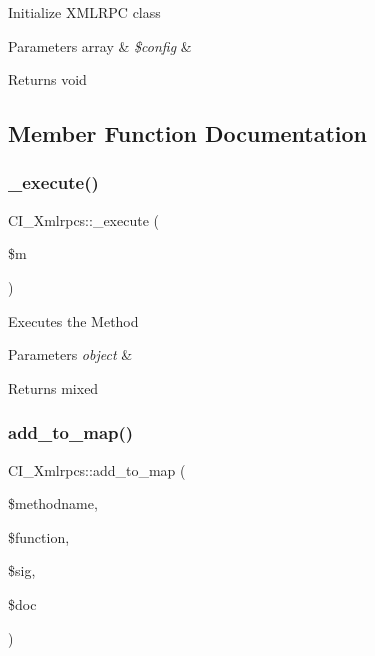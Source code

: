 Initialize X\+M\+L\+R\+PC class


\begin{DoxyParams}[1]{Parameters}
array & {\em \$config} & \\
\hline
\end{DoxyParams}
\begin{DoxyReturn}{Returns}
void 
\end{DoxyReturn}


\subsection{Member Function Documentation}
\mbox{\label{class_c_i___xmlrpcs_a4b0481451d0e70aa1c8e033890e514c9}} 
\subsubsection{\texorpdfstring{\+\_\+execute()}{\_execute()}}
{\footnotesize\ttfamily C\+I\+\_\+\+Xmlrpcs\+::\+\_\+execute (\begin{DoxyParamCaption}\item[{}]{\$m }\end{DoxyParamCaption})\hspace{0.3cm}{\ttfamily [protected]}}

Executes the Method


\begin{DoxyParams}{Parameters}
{\em object} & \\
\hline
\end{DoxyParams}
\begin{DoxyReturn}{Returns}
mixed 
\end{DoxyReturn}
\mbox{\label{class_c_i___xmlrpcs_affc4e3194f56c4c58f1e3f2cac8298c4}} 
\subsubsection{\texorpdfstring{add\+\_\+to\+\_\+map()}{add\_to\_map()}}
{\footnotesize\ttfamily C\+I\+\_\+\+Xmlrpcs\+::add\+\_\+to\+\_\+map (\begin{DoxyParamCaption}\item[{}]{\$methodname,  }\item[{}]{\$function,  }\item[{}]{\$sig,  }\item[{}]{\$doc }\end{DoxyParamCaption})}

